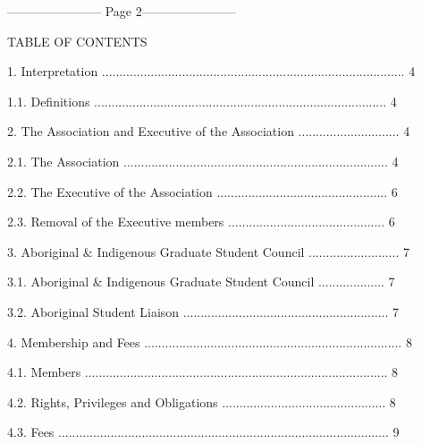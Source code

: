 ----------------------- Page 2-----------------------

                                           TABLE OF CONTENTS  



 1.    Interpretation ....................................................................................... 4  



     1.1.    Definitions .................................................................................... 4  



 2.    The Association and Executive of the Association ............................. 4  



     2.1.     The Association ............................................................................ 4  



     2.2.     The Executive of the Association ................................................. 6  



     2.3.    Removal of the Executive members ............................................. 6  



 3.    Aboriginal & Indigenous Graduate Student Council .......................... 7  



     3.1.    Aboriginal & Indigenous Graduate Student Council ................... 7  



     3.2.    Aboriginal Student Liaison ........................................................... 7  



 4.    Membership and Fees .......................................................................... 8  



     4.1.    Members ....................................................................................... 8  



     4.2.    Rights, Privileges and Obligations ............................................... 8  



     4.3.    Fees ............................................................................................... 9  



